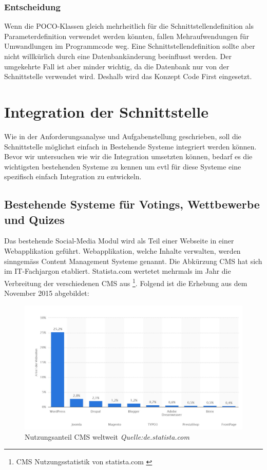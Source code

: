 \subsubsection{Entscheidung}\label{entscheidung}

Wenn die POCO-Klassen gleich mehrheitlich für die
Schnittstellendefinition als Parameterdefinition verwendet werden
könnten, fallen Mehraufwendungen für Umwandlungen im Programmcode weg.
Eine Schnittstellendefinition sollte aber nicht willkürlich durch eine
Datenbankänderung beeinflusst werden. Der umgekehrte Fall ist aber
minder wichtig, da die Datenbank nur von der Schnittstelle verwendet
wird. Deshalb wird das Konzept Code First eingesetzt.

\newpage

\hypertarget{integration-der-schnittstelle}{\section{Integration der
Schnittstelle}\label{integration-der-schnittstelle}}

Wie in der Anforderungsanalyse und Aufgabenstellung geschrieben, soll
die Schnittstelle möglichst einfach in Bestehende Systeme integriert
werden können. Bevor wir untersuchen wie wir die Integration umsetzten
können, bedarf es die wichtigsten bestehenden Systeme zu kennen um evtl
für diese Systeme eine spezifisch einfach Integration zu entwickeln.

\subsection{Bestehende Systeme für Votings, Wettbewerbe und
Quizes}\label{bestehende-systeme-fuxfcr-votings-wettbewerbe-und-quizes}

Das bestehende Social-Media Modul wird als Teil einer Webseite in einer
Webapplikation geführt. Webapplikation, welche Inhalte verwalten, werden
sinngemäss Content Management Systeme genannt. Die Abkürzung CMS hat
sich im IT-Fachjargon etabliert. Statista.com wertetet mehrmals im Jahr
die Verbreitung der verschiedenen CMS aus \footnote{CMS
  Nutzungsstatistik von statista.com \autocite{statisticinfostatista}}.
Folgend ist die Erhebung aus dem November 2015 abgebildet:

\begin{figure}[htbp]
\centering
\includegraphics{images/cms_statistik_november2015.JPG}
\caption{Nutzungsanteil CMS weltweit \emph{Quelle:de.statista.com}}
\end{figure}

